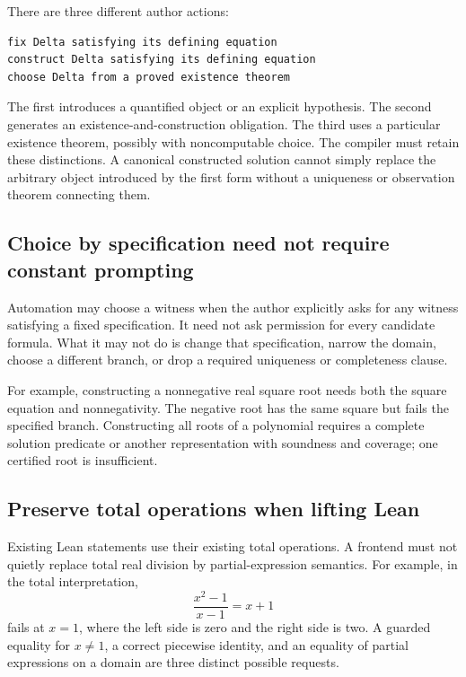 \documentclass[11pt,a4paper]{article}
\theoremstyle{plain}
\theoremstyle{definition}
\theoremstyle{remark}
\begin{document}
There are three different author actions:
\par\noindent\begin{minipage}{\linewidth}
\begin{lstlisting}
fix Delta satisfying its defining equation
construct Delta satisfying its defining equation
choose Delta from a proved existence theorem
\end{lstlisting}
\end{minipage}\par

The first introduces a quantified object or an explicit hypothesis. The
second generates an existence-and-construction obligation. The third uses a
particular existence theorem, possibly with noncomputable choice. The compiler
must retain these distinctions. A canonical constructed solution cannot simply
replace the arbitrary object introduced by the first form without a uniqueness
or observation theorem connecting them.

\subsection{Choice by specification need not require constant prompting}
Automation may choose a witness when the author explicitly asks for any witness
satisfying a fixed specification. It need not ask permission for every candidate
formula. What it may not do is change that specification, narrow the domain,
choose a different branch, or drop a required uniqueness or completeness clause.

For example, constructing a nonnegative real square root needs both the square
equation and nonnegativity. The negative root has the same square but fails
the specified branch. Constructing all roots of a polynomial requires a
complete solution predicate or another representation with soundness and
coverage; one certified root is insufficient.

\subsection{Preserve total operations when lifting Lean}
Existing Lean statements use their existing total operations. A frontend must
not quietly replace total real division by partial-expression semantics. For
example, in the total interpretation,
\[
 \frac{x^2-1}{x-1}=x+1
\]
fails at $x=1$, where the left side is zero and the right side is two.
A guarded equality for $x\ne1$, a correct piecewise identity, and an equality
of partial expressions on a domain are three distinct possible requests.
\end{document}
